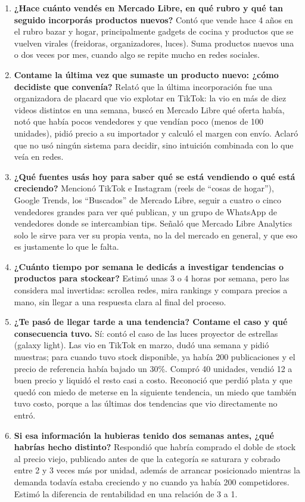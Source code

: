 \begin{enumerate}
	\item \textbf{¿Hace cuánto vendés en Mercado Libre, en qué rubro y qué tan seguido incorporás productos nuevos?} Contó que vende hace 4 años en el rubro bazar y hogar, principalmente gadgets de cocina y productos que se vuelven virales (freidoras, organizadores, luces). Suma productos nuevos una o dos veces por mes, cuando algo se repite mucho en redes sociales.
	\item \textbf{Contame la última vez que sumaste un producto nuevo: ¿cómo decidiste que convenía?} Relató que la última incorporación fue una organizadora de placard que vio explotar en TikTok: la vio en más de diez videos distintos en una semana, buscó en Mercado Libre qué oferta había, notó que había pocos vendedores y que vendían poco (menos de 100 unidades), pidió precio a su importador y calculó el margen con envío. Aclaró que no usó ningún sistema para decidir, sino intuición combinada con lo que veía en redes.
	\item \textbf{¿Qué fuentes usás hoy para saber qué se está vendiendo o qué está creciendo?} Mencionó TikTok e Instagram (reels de ``cosas de hogar''), Google Trends, los ``Buscados'' de Mercado Libre, seguir a cuatro o cinco vendedores grandes para ver qué publican, y un grupo de WhatsApp de vendedores donde se intercambian tips. Señaló que Mercado Libre Analytics solo le sirve para ver su propia venta, no la del mercado en general, y que eso es justamente lo que le falta.
	\item \textbf{¿Cuánto tiempo por semana le dedicás a investigar tendencias o productos para stockear?} Estimó unas 3 o 4 horas por semana, pero las considera mal invertidas: scrollea redes, mira rankings y compara precios a mano, sin llegar a una respuesta clara al final del proceso.
	\item \textbf{¿Te pasó de llegar tarde a una tendencia? Contame el caso y qué consecuencia tuvo.} Sí: contó el caso de las luces proyector de estrellas (galaxy light). Las vio en TikTok en marzo, dudó una semana y pidió muestras; para cuando tuvo stock disponible, ya había 200 publicaciones y el precio de referencia había bajado un 30\%. Compró 40 unidades, vendió 12 a buen precio y liquidó el resto casi a costo. Reconoció que perdió plata y que quedó con miedo de meterse en la siguiente tendencia, un miedo que también tuvo costo, porque a las últimas dos tendencias que vio directamente no entró.
	\item \textbf{Si esa información la hubieras tenido dos semanas antes, ¿qué habrías hecho distinto?} Respondió que habría comprado el doble de stock al precio viejo, publicado antes de que la categoría se saturara y cobrado entre 2 y 3 veces más por unidad, además de arrancar posicionado mientras la demanda todavía estaba creciendo y no cuando ya había 200 competidores. Estimó la diferencia de rentabilidad en una relación de 3 a 1.

\end{enumerate}
